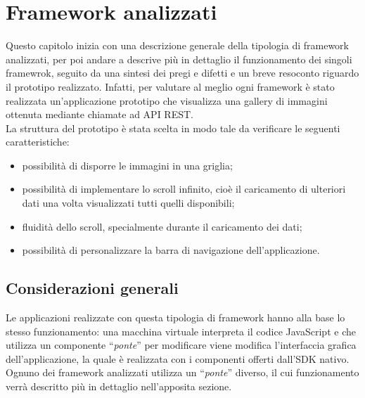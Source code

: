 
\chapter{Framework analizzati}
\label{cap:framework-analizzati}
Questo capitolo inizia con una descrizione generale della tipologia di framework analizzati, per poi andare a descrive più in dettaglio il funzionamento dei singoli framewrok, seguito da una sintesi dei pregi e difetti e un breve resoconto riguardo il prototipo realizzato.
Infatti, per valutare al meglio ogni framework è stato realizzata un'applicazione prototipo che visualizza una gallery di immagini ottenuta mediante chiamate ad \gls{API} \gls{REST}.\\
La struttura del prototipo è stata scelta in modo tale da verificare le seguenti caratteristiche:
\begin{itemize}
\item possibilità di disporre le immagini in una griglia;
\item possibilità di implementare lo scroll infinito, cioè il caricamento di ulteriori dati una volta visualizzati tutti quelli disponibili;
\item fluidità dello scroll, specialmente durante il caricamento dei dati;
\item possibilità di personalizzare la barra di navigazione dell'applicazione.
\end{itemize}


\section{Considerazioni generali}
Le applicazioni realizzate con questa tipologia di framework hanno alla base lo stesso funzionamento: una macchina virtuale interpreta il codice JavaScript e che utilizza un componente ``\textit{ponte}'' per modificare viene modifica l'interfaccia grafica dell'applicazione, la quale è realizzata con i componenti offerti dall'SDK nativo.
Ognuno dei framework analizzati utilizza un ``\textit{ponte}'' diverso, il cui funzionamento verrà descritto più in dettaglio nell'apposita sezione.

